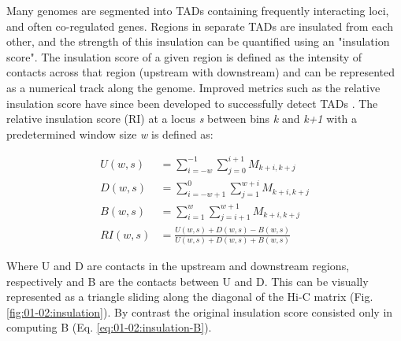 Many genomes are segmented into \acrshort{TAD}s containing frequently interacting loci, and often co-regulated genes. Regions in separate \acrshort{TAD}s are insulated from each other, and the strength of this insulation can be quantified using an "insulation score". The insulation score of a given region is defined as the intensity of contacts across that region (upstream with downstream) \cite{craneCondensindrivenRemodellingChromosome2015} and can be represented as a numerical track along the genome. Improved metrics such as the relative insulation score have since been developed to successfully detect \acrshort{TAD}s \cite{chenHiCDBSensitiveRobust2018}. The relative insulation score (RI) at a locus \textit{s} between bins \textit{k} and \textit{k+1} with a predetermined window size \textit{w} is defined as:

\begin{align}
    \label{eq:01-02:insulation-U}
    U(w, s) &= \sum_{i=-w}^{-1}{\sum_{j=0}^{i+1}{M_{k+i,k+j}}} \\
    \label{eq:01-02:insulation-D}
    D(w, s) &= \sum_{i=-w+1}^{0}{\sum_{j=1}^{w+i}{M_{k+i,k+j}}} \\
    \label{eq:01-02:insulation-B}
    B(w, s) &= \sum_{i=1}^{w}{\sum_{j=i+1}^{w+1}{M_{k+i,k+j}}} \\
    \label{eq:01-02:insulation-RI}
    RI(w, s) &= \frac{U(w, s) + D(w, s) - B(w, s)}{U(w, s) + D(w, s) + B(w, s)}
\end{align}

Where U and D are contacts in the upstream and downstream regions, respectively and B are the contacts between U and D. This can be visually represented as a triangle sliding along the diagonal of the Hi-C matrix (Fig. \ref{fig:01-02:insulation}). By contrast the original insulation score consisted only in computing B (Eq. \ref{eq:01-02:insulation-B}).

